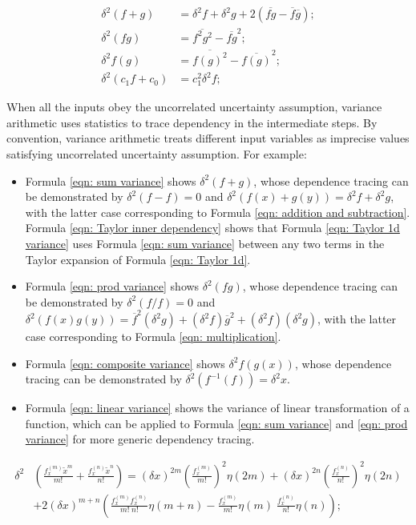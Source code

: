 \documentclass[twoside]{article}
\numberwithin{equation}{section}
\begin{document}
\fi

\begin{align}
\label{eqn: sum variance}
\delta^2 (f + g) &= \delta^2 f + \delta^2 g + 2 (\overline{fg} - \overline{f}\overline{g}); \\
\label{eqn: prod variance}
\delta^2 (f g) &= \overline{f^2 g^2} - \overline{f g}^2; \\
\label{eqn: composite variance}
\delta^2 f(g) &= \overline{f(g)^2} - \overline{f(g)}^2; \\
\label{eqn: linear variance}
\delta^2 (c_1 f + c_0) &= c_1^2 \delta^2f; 
\end{align}

When all the inputs obey the uncorrelated uncertainty assumption, variance arithmetic uses statistics to trace dependency in the intermediate steps.
By convention, variance arithmetic treats different input variables as imprecise values satisfying uncorrelated uncertainty assumption.
For example:
\begin{itemize}
\item Formula \eqref{eqn: sum variance} shows $\delta^2 (f + g)$, whose dependence tracing can be demonstrated by $\delta^2 (f - f) = 0$  and $\delta^2 (f(x) + g(y)) = \delta^2 f + \delta^2 g$, with the latter case corresponding to Formula \eqref{eqn: addition and subtraction}.   Formula \eqref{eqn: Taylor inner dependency} shows that Formula \eqref{eqn: Taylor 1d variance} uses Formula \eqref{eqn: sum variance} between any two terms in the Taylor expansion of Formula \eqref{eqn: Taylor 1d}.

\item Formula \eqref{eqn: prod variance} shows  $\delta^2 (f g)$, whose dependence tracing can be demonstrated by $\delta^2 (f/f) = 0$  and $\delta^2 (f(x) g(y)) = \overline{f}^2 (\delta^2 g) + (\delta^2 f) \overline{g}^2 +  (\delta^2 f) (\delta^2 g)$, with the latter case corresponding to Formula \eqref{eqn: multiplication}.  

\item Formula \eqref{eqn: composite variance} shows  $\delta^2 f(g(x))$, whose dependence tracing can be demonstrated by $\delta^2 (f^{-1}(f)) = \delta^2 x$.  

\item Formula \eqref{eqn: linear variance} shows the variance of linear transformation of a function, which can be applied to Formula \eqref{eqn: sum variance} and \eqref{eqn: prod variance} for more generic dependency tracing.
\end{itemize}
\begin{align}
\label{eqn: Taylor inner dependency}
\delta^2 & \left( \frac{f^{(m)}_x \tilde{x}^m}{m!} + \frac{f^{(n)}_x \tilde{x}^n}{n!} \right) = 
    (\delta x)^{2m} (\frac{f^{(m)}_x }{m!})^2 \eta(2m) + (\delta x)^{2n} (\frac{f^{(n)}_x }{n!})^2 \eta(2n) \\
  &+ 2 (\delta x)^{m+n} \left( \frac{f^{(m)}_x f^{(n)}_x}{m! \;n!} \eta(m+n) 	- \frac{f^{(m)}_x}{m!} \eta(m) \;\frac{f^{(n)}_x}{n!}  \eta(n) \right);  \nonumber
\end{align}
\end{document}
